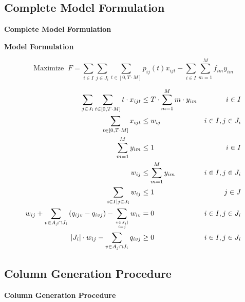 \subsection{Complete Model Formulation}
\begin{frame}
\begin{center}
{\LARGE \textbf{Complete Model Formulation}}
\end{center}
\end{frame}

\begin{frame}{\textbf{Model Formulation}}

\tiny
\begin{equation}
\text{Maximize } \ F =  \sum_{i \in I} \sum_{j \in J_i} \sum_{t \in [0,T \cdot M]} p_{ij}(t)  x_{ijt} - \sum_{i \in I} \sum_{m=1}^M f_{im} y_{im}  %
\end{equation} 

\begin{align}
    \sum_{ j \in J_i} \sum_{t\in [0,T \cdot M]} t \cdot x_{ijt} &\leq T \cdot \sum_{m=1}^M m \cdot y_{im} &i \in I \\
    \sum_{t \in \left[0,T \cdot M \right]}x_{ijt} &\leq w_{ij} &i \in I, j \in J_i \\
    \sum_{m=1}^M y_{im} &\le 1 &i \in I \\
    w_{ij} &\le  \sum_{m = 1}^M y_{im} &i \in I,  j \in J_i \\
    \sum_{i \in I\mid j \in J_i} w_{ij}   &\le 1 &j \in J \label{eq_scuassign} \\
    w_{ij} + \sum_{v \in A_j \cap J_i} \left(q_{ijv} - q_{ivj} \right) - \sum_{v \in J_i \mid \atop i=j} w_{iv} &= 0 &i \in I,  j \in J_i \\
    \left|J_i\right|\cdot w_{ij} - \sum_{v \in A_j \cap J_i} q_{ivj} &\geq 0 &i \in I, j \in J_i 
\end{align}
\normalsize



\end{frame}




\subsection{Column Generation Procedure}
\begin{frame}
\begin{center}
{\LARGE \textbf{Column Generation Procedure}}
\end{center}
\end{frame}

